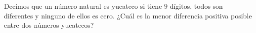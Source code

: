 Decimos que un número natural es yucateco si tiene $9$ dígitos, todos son diferentes y ninguno de ellos es cero. ¿Cuál es la menor diferencia positiva posible entre dos números yucatecos?